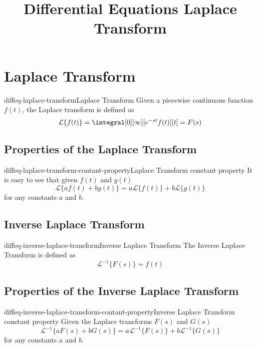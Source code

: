 \documentclass[preview]{standalone}
\begin{document}
\title{Differential Equations Laplace Transform}
\genpage

\section{Laplace Transform}

\begin{snippetdefinition}{diffeq-laplace-transform}{Laplace Transform}{
    Given a piecewise continuous function \(f(t)\), the Laplace transform
    is defined as
    \[
        \mathcal{L}\{f(t)\}= \integral[0][\infty][e^{-st}f(t)][t]=F(s)
    \]
}
\end{snippetdefinition}

\subsection{Properties of the Laplace Transform}

\begin{snippetcorollary}{diffeq-laplace-transform-contant-property}{Laplace Transform constant property}{
    It is easy to see that given \(f(t)\) and \(g(t)\)
    \[
        \mathcal{L}\{af(t)+bg(t)\} = a\mathcal{L}\{f(t)\} + b\mathcal{L}\{g(t)\}
    \]
    for any constants \(a\) and \(b\).
}
\end{snippetcorollary}

\subsection{Inverse Laplace Transform}

\begin{snippetdefinition}{diffeq-inverse-laplace-transform}{Inverse Laplace Transform}{
    The Inverse Laplace Transform is defined as
    \[
        {\mathcal{L}}^{-1} \{F(s)\}= f(t)
    \]
}
\end{snippetdefinition}

\subsection{Properties of the Inverse Laplace Transform}

\begin{snippetcorollary}{diffeq-inverse-laplace-transform-contant-property}{Inverse Laplace Transform constant property}{
    Given the Laplace transforms \(F(s)\) and \(G(s)\)
    \[
        {\mathcal{L}}^{-1} \{aF(s)+bG(s)\} =
        a{\mathcal{L}}^{-1}\{F(s)\} +
        b{\mathcal{L}}^{-1}\{G(s)\}
    \]
    for any constants \(a\) and \(b\).
}
\end{snippetcorollary}
\end{document}
